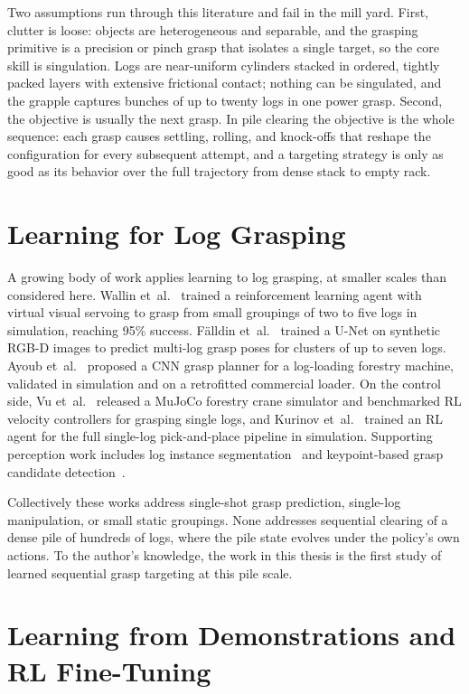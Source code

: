 Two assumptions run through this literature and fail in the mill yard. First,
clutter is loose: objects are heterogeneous and separable, and the grasping
primitive is a precision or pinch grasp that isolates a single target, so the
core skill is singulation. Logs are near-uniform cylinders stacked in ordered,
tightly packed layers with extensive frictional contact; nothing can be
singulated, and the grapple captures bunches of up to twenty logs in one power
grasp. Second, the objective is usually the next grasp. In pile clearing the
objective is the whole sequence: each grasp causes settling, rolling, and
knock-offs that reshape the configuration for every subsequent attempt, and a
targeting strategy is only as good as its behavior over the full trajectory
from dense stack to empty rack.

\section{Learning for Log Grasping}

A growing body of work applies learning to log grasping, at smaller scales
than considered here. Wallin et~al.~\cite{wallin2024multilog} trained a
reinforcement learning agent with virtual visual servoing to grasp from small
groupings of two to five logs in simulation, reaching 95\% success. F{\"a}lldin
et~al.~\cite{falldin2025synthesizing} trained a U-Net on synthetic RGB-D
images to predict multi-log grasp poses for clusters of up to seven logs.
Ayoub et~al.~\cite{ayoub2023grasp} proposed a CNN grasp planner for a
log-loading forestry machine, validated in simulation and on a retrofitted
commercial loader. On the control side, Vu et~al.~\cite{vu2025autonomous}
released a MuJoCo forestry crane simulator and benchmarked RL velocity
controllers for grasping single logs, and Kurinov
et~al.~\cite{kurinov2025reinforcement} trained an RL agent for the full
single-log pick-and-place pipeline in simulation. Supporting perception work
includes log instance segmentation~\cite{fortin2022instance} and keypoint-based
grasp candidate detection~\cite{xu2021}.

Collectively these works address single-shot grasp prediction, single-log
manipulation, or small static groupings. None addresses sequential clearing of
a dense pile of hundreds of logs, where the pile state evolves under the
policy's own actions. To the author's knowledge, the work in this thesis is
the first study of learned sequential grasp targeting at this pile scale.

\section{Learning from Demonstrations and RL Fine-Tuning}


